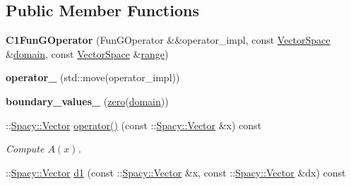 \subsection*{\-Public \-Member \-Functions}
\begin{DoxyCompactItemize}
\item 
\hypertarget{classSpacy_1_1dealII_1_1C1FunGOperator_a45fe81925630852eaa8ac4acc1effc00}{{\bfseries \-C1\-Fun\-G\-Operator} (\-Fun\-G\-Operator \&\&operator\-\_\-impl, const \hyperlink{classSpacy_1_1VectorSpace}{\-Vector\-Space} \&\hyperlink{classSpacy_1_1OperatorBase_a2588f9b3e0188820c4c494e63293dc6f}{domain}, const \hyperlink{classSpacy_1_1VectorSpace}{\-Vector\-Space} \&\hyperlink{classSpacy_1_1OperatorBase_ab19d3b7a6f290b1079248f1e567e53d6}{range})}\label{classSpacy_1_1dealII_1_1C1FunGOperator_a45fe81925630852eaa8ac4acc1effc00}

\item 
\hypertarget{classSpacy_1_1dealII_1_1C1FunGOperator_ac452cdc0965cd00152cc0ab683c2d574}{{\bfseries operator\-\_\-} (std\-::move(operator\-\_\-impl))}\label{classSpacy_1_1dealII_1_1C1FunGOperator_ac452cdc0965cd00152cc0ab683c2d574}

\item 
\hypertarget{classSpacy_1_1dealII_1_1C1FunGOperator_a7acddd08cb016d423d2dd3d6d6e37af1}{{\bfseries boundary\-\_\-values\-\_\-} (\hyperlink{namespaceSpacy_ac7f0661bfdb52144b9ff0b9bbdd81f69}{zero}(\hyperlink{classSpacy_1_1OperatorBase_a2588f9b3e0188820c4c494e63293dc6f}{domain}))}\label{classSpacy_1_1dealII_1_1C1FunGOperator_a7acddd08cb016d423d2dd3d6d6e37af1}

\item 
\hypertarget{classSpacy_1_1dealII_1_1C1FunGOperator_a22f45eb52fe6d89516e3f63ab59af207}{\-::\hyperlink{classSpacy_1_1Vector}{\-Spacy\-::\-Vector} \hyperlink{classSpacy_1_1dealII_1_1C1FunGOperator_a22f45eb52fe6d89516e3f63ab59af207}{operator()} (const \-::\hyperlink{classSpacy_1_1Vector}{\-Spacy\-::\-Vector} \&x) const }\label{classSpacy_1_1dealII_1_1C1FunGOperator_a22f45eb52fe6d89516e3f63ab59af207}

\begin{DoxyCompactList}\small\item\em \-Compute $A(x)$. \end{DoxyCompactList}\item 
\hypertarget{classSpacy_1_1dealII_1_1C1FunGOperator_aaf6eca6d41b90ca1e948bd580f48575f}{\-::\hyperlink{classSpacy_1_1Vector}{\-Spacy\-::\-Vector} \hyperlink{classSpacy_1_1dealII_1_1C1FunGOperator_aaf6eca6d41b90ca1e948bd580f48575f}{d1} (const \-::\hyperlink{classSpacy_1_1Vector}{\-Spacy\-::\-Vector} \&x, const \-::\hyperlink{classSpacy_1_1Vector}{\-Spacy\-::\-Vector} \&dx) const }\label{classSpacy_1_1dealII_1_1C1FunGOperator_aaf6eca6d41b90ca1e948bd580f48575f}


\end{DoxyCompactItemize}
